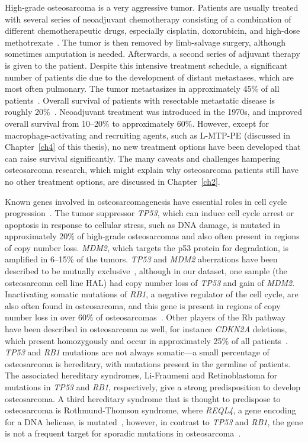 High-grade osteosarcoma is a very aggressive tumor. Patients are usually treated with several series of neoadjuvant chemotherapy consisting of a combination of different chemotherapeutic drugs, especially cisplatin, doxorubicin, and high\hyp{}dose methotrexate~\cite{raymond2002conventional}. The tumor is then removed by limb\hyp{}salvage surgery, although sometimes amputation is needed. Afterwards, a second series of adjuvant therapy is given to the patient. Despite this intensive treatment schedule, a significant number of patients die due to the development of distant metastases, which are most often pulmonary. The tumor metastasizes in approximately 45\% of all patients~\cite{pakos2009prognostic}. Overall survival of patients with resectable metastatic disease is roughly 20\%~\cite{buddingh2010prognostic}. Neoadjuvant treatment was introduced in the 1970s, and improved overall survival from 10--20\% to approximately 60\%. However, except for macrophage\hyp{}activating and recruiting agents, such as L-MTP-PE (discussed in Chapter~\ref{ch4} of this thesis), no new treatment options have been developed that can raise survival significantly. The many caveats and challenges hampering osteosarcoma research, which might explain why osteosarcoma patients still have no other treatment options, are discussed in Chapter~\ref{ch2}.

Known genes involved in osteosarcomagenesis have essential roles in cell cycle progression~\cite{cleton2005central}. The tumor suppressor {\it TP53}, which can induce cell cycle arrest or apoptosis in response to cellular stress, such as DNA damage, is mutated in approximately 20\% of high\hyp{}grade osteosarcomas and also often present in regions of copy number loss. {\it MDM2}, which targets the p53 protein for degradation, is amplified in 6--15\% of the tumors. {\it TP53} and {\it MDM2} aberrations have been described to be mutually exclusive~\cite{overholtzer2003presence}, although in our dataset, one sample (the osteosarcoma cell line HAL) had copy number loss of {\it TP53} and gain of {\it MDM2}. Inactivating somatic mutations of {\it RB1}, a negative regulator of the cell cycle, are also often found in osteosarcoma, and this gene is present in regions of copy number loss in over 60\% of osteosarcomas~\cite{thomas2003role,kuijjer2012identification}. Other players of the Rb pathway have been described in osteosarcoma as well, for instance {\it CDKN2A} deletions, which present homozygously and occur in approximately 25\% of all patients~\cite{mohseny2010small}. {\it TP53} and {\it RB1} mutations are not always somatic---a small percentage of osteosarcoma is hereditary, with mutations present in the germline of patients. The associated hereditary syndromes, Li\hyp{}Fraumeni and Retinoblastoma for mutations in {\it TP53} and {\it RB1}, respectively, give a strong predisposition to develop osteosarcoma. A third hereditary syndrome that is thought to predispose to osteosarcoma is Rothmund\hyp{}Thomson syndrome, where {\it REQL4}, a gene encoding for a DNA helicase, is mutated~\cite{calvert2012risk}, however, in contrast to {\it TP53} and {\it RB1}, the gene is not a frequent target for sporadic mutations in osteosarcoma~\cite{nishijo2004mutation}.

